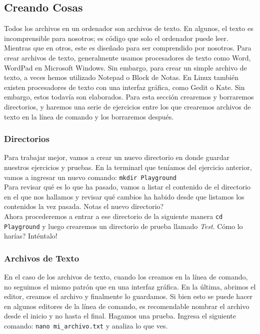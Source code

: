 \documentclass[10pt,letterpaper]{article}
\newcommand{\inlinecode}[1]{
\colorbox{light-gray}{\texttt{#1}}
}
\begin{document}
\subsection{Creando Cosas}
Todos los archivos en un ordenador son archivos de texto. En algunos, el texto es incomprensible para nosotros; es c\'odigo que solo el ordenador puede leer. Mientras que en otros, este es dise\~nado para ser comprendido por nosotros. Para crear archivos de texto, generalmente usamos procesadores de texto como Word, WordPad en Microsoft Windows. Sin embargo, para crear un simple archivo de texto, a veces hemos utilizado Notepad o Block de Notas. En Linux tambi\'en existen procesadores de texto con una interfaz gr\'afica, como Gedit o Kate. Sin embargo, estos todav\'ia son elaborados. Para esta secci\'on crearemos y borraremos directorios, y haremos una serie de ejercicios entre los que crearemos archivos de texto en la l\'inea de comando y los borraremos despu\'es.

\subsubsection{Directorios}
Para trabajar mejor, vamos a crear un nuevo directorio en donde guardar nuestros ejercicios y pruebas. En la terminarl que ten\'iamos del ejercicio anterior, vamos a ingresar un nuevo comando: \inlinecode{mkdir Playground}\\

Para revisar qu\'e es lo que ha pasado, vamos a listar el contenido de el directorio en el que nos hallamos y revisar qu\'e cambios ha habido desde que listamos los contenidos la vez pasada. Notas el nuevo directorio?\\

Ahora procederemos a entrar a ese directorio de la siguiente manera \inlinecode{cd Playground} y luego crearemos un directorio de prueba llamado \emph{Test}. C\'omo lo har\'ias? Int\'entalo!

\subsubsection{Archivos de Texto}
En el caso de los archivos de texto, cuando los creamos en la l\'inea de comando, no seguimos el mismo patr\'on que en una interfaz gr\'afica. En la \'ultima, abrimos el editor, creamos el archivo y finalmente lo guardamos. Si bien esto se puede hacer en algunos editores de la l\'inea de comando, es recomendable nombrar el archivo desde el inicio y no hasta el final. Hagamos una prueba. Ingresa el siguiente comando: \inlinecode{nano mi\_archivo.txt} y analiza lo que ves.\\
\end{document}
